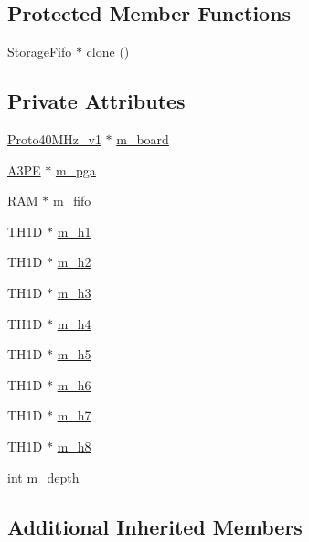 \subsection*{Protected Member Functions}
\begin{DoxyCompactItemize}
\item 
\hyperlink{classStorageFifo_1_1StorageFifo}{Storage\+Fifo} $\ast$ \hyperlink{classStorageFifo_a80b534eb6d81a3b570f6957d6a932987}{clone} ()
\end{DoxyCompactItemize}
\subsection*{Private Attributes}
\begin{DoxyCompactItemize}
\item 
\hyperlink{classProto40MHz__v1}{Proto40\+M\+Hz\+\_\+v1} $\ast$ \hyperlink{classStorageFifo_adca2141575d4994ef13e3dabe2e06c52}{m\+\_\+board}
\item 
\hyperlink{classA3PE}{A3\+PE} $\ast$ \hyperlink{classStorageFifo_a9e4b9d56d0cc911f124a2848d6b43981}{m\+\_\+pga}
\item 
\hyperlink{classRAM}{R\+AM} $\ast$ \hyperlink{classStorageFifo_a4b1f3eb44df4f2d46a8a62189d662390}{m\+\_\+fifo}
\item 
T\+H1D $\ast$ \hyperlink{classStorageFifo_abe762844e442bc8188643b18b276d801}{m\+\_\+h1}
\item 
T\+H1D $\ast$ \hyperlink{classStorageFifo_a3caf6211541aaa4be8e60c03d79bf253}{m\+\_\+h2}
\item 
T\+H1D $\ast$ \hyperlink{classStorageFifo_a7e6b54c96a9b53a9917f7f21bda12b2e}{m\+\_\+h3}
\item 
T\+H1D $\ast$ \hyperlink{classStorageFifo_ad026ffc1c7590bb3563538490be9aa00}{m\+\_\+h4}
\item 
T\+H1D $\ast$ \hyperlink{classStorageFifo_ae9133c5421f9fa166b837933706d2a59}{m\+\_\+h5}
\item 
T\+H1D $\ast$ \hyperlink{classStorageFifo_a39ca376b2a74643c54e4df2dfabf0906}{m\+\_\+h6}
\item 
T\+H1D $\ast$ \hyperlink{classStorageFifo_a01784ff4138a1b32eb517931b5866cc6}{m\+\_\+h7}
\item 
T\+H1D $\ast$ \hyperlink{classStorageFifo_aeef4b7183e14d05bab673d948d85b84c}{m\+\_\+h8}
\item 
int \hyperlink{classStorageFifo_a4312878a2a96e6a306be9e5fd99064d5}{m\+\_\+depth}
\end{DoxyCompactItemize}
\subsection*{Additional Inherited Members}


